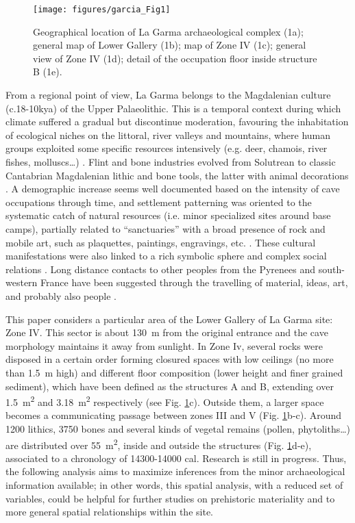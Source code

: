 \begin{figure}
	\texttt{[image: figures/garcia\_Fig1]}
	\caption{Geographical location of La Garma archaeological complex (1a); general map of Lower Gallery (1b); map of Zone IV (1c); general view of Zone IV (1d); detail of the occupation floor inside structure B (1e).}
	\label{fig:Garcia_Fig1}
\end{figure}

From a regional point of view, La Garma belongs to the Magdalenian culture (c.18-10kya) of the Upper Palaeolithic. This is a temporal context during which climate suffered a gradual but discontinue moderation, favouring the inhabitation of ecological niches on the littoral, river valleys and mountains, where human groups exploited some specific resources intensively (e.g. deer, chamois, river fishes, molluscs…) \parencites{Strauss_2010}{Utrilla_2004}. Flint and bone industries evolved from Solutrean to classic Cantabrian Magdalenian lithic and bone tools, the latter with animal decorations \parencites{González_2004}{Álvarez_2007}. A demographic increase seems well documented based on the intensity of cave occupations through time, and settlement patterning was oriented to the systematic catch of natural resources (i.e. minor specialized sites around base camps), partially related to “sanctuaries” with a broad presence of rock and mobile art, such as plaquettes, paintings, engravings, etc. \parencites{Strauss_1992}{Strauss_2010}. These cultural manifestations were also linked to a rich symbolic sphere and complex social relations \parencites{Arias_2009}{Schwendler_2012}. Long distance contacts to other peoples from the Pyrenees and south-western France have been suggested through the travelling of material, ideas, art, and probably also people \parencite{Sauvet_2008}.

This paper considers a particular area of the Lower Gallery of La Garma site: Zone IV. This sector is about \SI{130}{\meter} from the original entrance and the cave morphology maintains it away from sunlight. In Zone Iv, several rocks were disposed in a certain order forming closured spaces with low ceilings (no more than \SI{1.5}{\meter} high) and different floor composition (lower height and finer grained sediment), which have been defined as the structures A and B, extending over \SI{1.5}{\meter\squared} and \SI{3.18}{\meter\squared} respectively (see Fig. \ref{fig:Garcia_Fig1}c). Outside them, a larger space becomes a communicating passage between zones III and V (Fig. \ref{fig:Garcia_Fig1}b-c). Around \num{1200} lithics, \num{3750} bones and several kinds of vegetal remains (pollen, phytoliths…) are distributed over \SI{55}{\meter\squared}, inside and outside the structures (Fig. \ref{fig:Garcia_Fig1}d-e), associated to a chronology of 14300-14000 cal\BC \parencite{Arias_2011}. 
Research is still in progress. Thus, the following analysis aims to maximize inferences from the minor archaeological information available; in other words, this spatial analysis, with a reduced set of variables, could be helpful for further studies on prehistoric materiality and to more general spatial relationships within the site.

